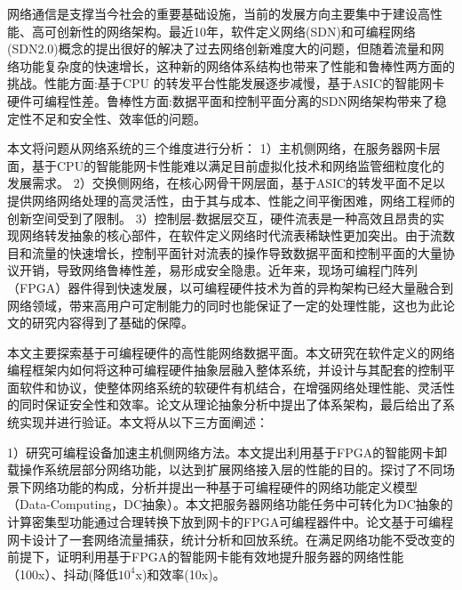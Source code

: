 
\setcounter{page}{1}

%
%
%

网络通信是支撑当今社会的重要基础设施，当前的发展方向主要集中于建设高性能、高可创新性的网络架构。最近10年，软件定义网络(SDN)和可编程网络(SDN2.0)概念的提出很好的解决了过去网络创新难度大的问题，但随着流量和网络功能复杂度的快速增长，这种新的网络体系结构也带来了性能和鲁棒性两方面的挑战。性能方面:基于CPU 的转发平台性能发展逐步减慢，基于ASIC的智能网卡硬件可编程性差。鲁棒性方面:数据平面和控制平面分离的SDN网络架构带来了稳定性不足和安全性、效率低的问题。

本文将问题从网络系统的三个维度进行分析：
1）主机侧网络，在服务器网卡层面，基于CPU的智能能网卡性能难以满足目前虚拟化技术和网络监管细粒度化的发展需求。
2）交换侧网络，在核心网骨干网层面，基于ASIC的转发平面不足以提供网络网络处理的高灵活性，由于其与成本、性能之间平衡困难，网络工程师的创新空间受到了限制。
3）控制层-数据层交互，硬件流表是一种高效且昂贵的实现网络转发抽象的核心部件，在软件定义网络时代流表稀缺性更加突出。由于流数目和流量的快速增长，控制平面针对流表的操作导致数据平面和控制平面的大量协议开销，导致网络鲁棒性差，易形成安全隐患。近年来，现场可编程门阵列（FPGA）器件得到快速发展，以可编程硬件技术为首的异构架构已经大量融合到网络领域，带来高用户可定制能力的同时也能保证了一定的处理性能，这也为此论文的研究内容得到了基础的保障。

本文主要探索基于可编程硬件的高性能网络数据平面。本文研究在软件定义的网络编程框架内如何将这种可编程硬件抽象层融入整体系统，并设计与其配套的控制平面软件和协议，使整体网络系统的软硬件有机结合，在增强网络处理性能、灵活性的同时保证安全性和效率。论文从理论抽象分析中提出了体系架构，最后给出了系统实现并进行验证。本文将从以下三方面阐述：

1）研究可编程设备加速主机侧网络方法。本文提出利用基于FPGA的智能网卡卸载操作系统层部分网络功能，以达到扩展网络接入层的性能的目的。探讨了不同场景下网络功能的构成，分析并提出一种基于可编程硬件的网络功能定义模型（Data-Computing，DC抽象）。本文把服务器网络功能任务中可转化为DC抽象的计算密集型功能通过合理转换下放到网卡的FPGA可编程器件中。论文基于可编程网卡设计了一套网络流量捕获，统计分析和回放系统。在满足网络功能不受改变的前提下，证明利用基于FPGA的智能网卡能有效地提升服务器的网络性能（100x）、抖动(降低$10^4$x)和效率(10x)。

